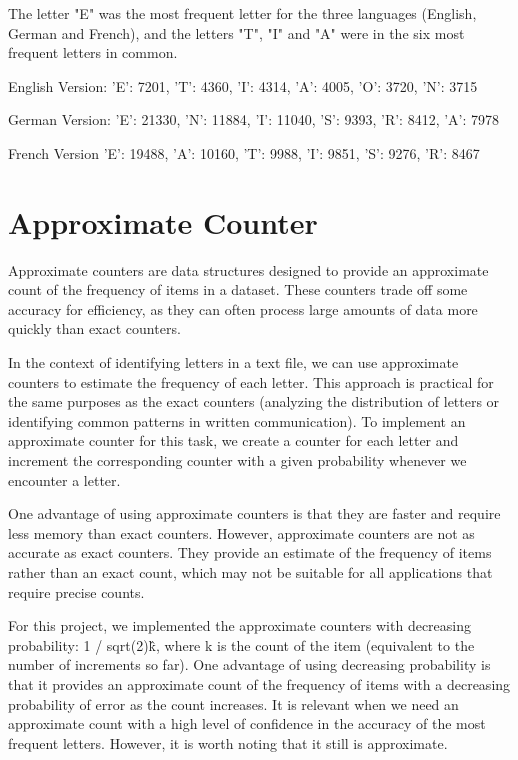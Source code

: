 \documentclass[]{revdetua}
\begin{document}
The letter "E" was the most frequent letter for the three languages (English, German and French), and the letters "T", "I" and "A" were in the six most frequent letters in common.

English Version:
{'E': 7201, 'T': 4360, 'I': 4314, 'A': 4005, 'O': 3720, 'N': 3715}

German Version:
{'E': 21330, 'N': 11884, 'I': 11040, 'S': 9393, 'R': 8412, 'A': 7978}

French Version
{'E': 19488, 'A': 10160, 'T': 9988, 'I': 9851, 'S': 9276, 'R': 8467}

\section{Approximate Counter}

Approximate counters are data structures designed to provide an approximate count of the frequency of items in a dataset. These counters trade off some accuracy for efficiency, as they can often process large amounts of data more quickly than exact counters. 

In the context of identifying letters in a text file, we can use approximate counters to estimate the frequency of each letter. This approach is practical for the same purposes as the exact counters (analyzing the distribution of letters or identifying common patterns in written communication). To implement an approximate counter for this task, we create a counter for each letter and increment the corresponding counter with a given probability whenever we encounter a letter. 

One advantage of using approximate counters is that they are faster and require less memory than exact counters. However, approximate counters are not as accurate as exact counters. They provide an estimate of the frequency of items rather than an exact count, which may not be suitable for all applications that require precise counts.

For this project, we implemented the approximate counters with decreasing probability: 1 / sqrt(2)\^k, where k is the count of the item (equivalent to the number of increments so far). One advantage of using decreasing probability is that it provides an approximate count of the frequency of items with a decreasing probability of error as the count increases. It is relevant when we need an approximate count with a high level of confidence in the accuracy of the most frequent letters. However, it is worth noting that it still is approximate.
\end{document}
